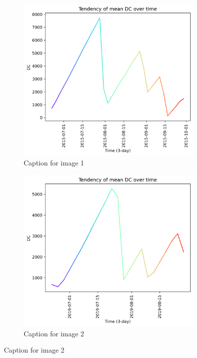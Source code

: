 \begin{figure}[h]
	\caption{HELLo}
	\centering
	\begin{subfigure}{0.49\textwidth}
		\centering
		\includegraphics[width=\textwidth]{graphs/2015/tendency/2015_tendency_graph_DC.png}
		\caption{Caption for image 1}
		\label{fig:img1}
	\end{subfigure}
	\hfill
	\begin{subfigure}{0.49\textwidth}
		\centering
		\includegraphics[width=\textwidth]{graphs/2019/tendency/2019_tendency_graph_DC.png}
		\caption{Caption for image 2}
		\label{fig:img2}
	\end{subfigure}
	\label{fig:both_images}
\end{figure}

